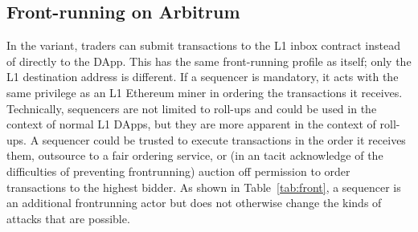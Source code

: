 	
\subsection{Front-running on Arbitrum}
\label{sec:frontarb}

In the \cm variant, traders can submit transactions to the L1 inbox contract instead of directly to the \cm DApp. This has the same front-running profile as \cm itself; only the L1 destination address is different. If a sequencer is mandatory, it acts with the same privilege as an L1 Ethereum miner in ordering the transactions it receives. Technically, sequencers are not limited to roll-ups and could be used in the context of normal L1 DApps, but they are more apparent in the context of roll-ups. A sequencer could be trusted to execute transactions in the order it receives them, outsource to a fair ordering service, or (in an tacit acknowledge of the difficulties of preventing frontrunning) auction off permission to order transactions to the highest bidder. As shown in Table~\ref{tab:front}, a sequencer is an additional frontrunning actor but does not otherwise change the kinds of attacks that are possible.



